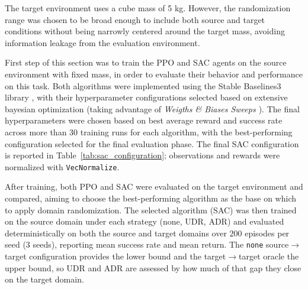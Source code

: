 The target environment uses a cube mass of 5 kg. However, the randomization range was chosen to be broad enough to include both source and target conditions without being narrowly centered around the target mass, avoiding information leakage from the evaluation environment.

First step of this section was to train the PPO and SAC agents on the source environment with fixed mass, in order to evaluate their behavior and performance on this task.
Both algorithms were implemented using the Stable Baselines3 library \cite{stable-baselines3}, with their hyperparameter configurations selected based on extensive bayesian optimization (taking advantage of \textit{Weigths \& Biases Sweeps \cite{wandb}}).
The final hyperparameters were chosen based on best average reward and success rate across more than 30 training runs for each algorithm, with the best-performing configuration selected for the final evaluation phase.
The final SAC configuration is reported in Table~\ref{tab:sac_configuration}; observations and rewards were normalized with \texttt{VecNormalize}.

\begin{table}[ht]
\centering
\caption{Final SAC Configuration}
\label{tab:sac_configuration}
\end{table}

After training, both PPO and SAC were evaluated on the target environment and compared, aiming to choose the best-performing algorithm as the base on which to apply domain randomization.
The selected algorithm (SAC) was then trained on the source domain under each strategy (none, UDR, ADR) and evaluated deterministically on both the source and target domains over $200$ episodes per seed ($3$ seeds), reporting mean success rate and mean return. The \texttt{none} source$\to$target configuration provides the lower bound and the target$\to$target oracle the upper bound, so UDR and ADR are assessed by how much of that gap they close on the target domain.